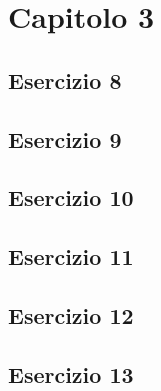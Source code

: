 \section{\textbf{Capitolo 3}}
\subsection{Esercizio 8}

\subsection{Esercizio 9}

\subsection{Esercizio 10}

\subsection{Esercizio 11}

\subsection{Esercizio 12}

\subsection{Esercizio 13}

